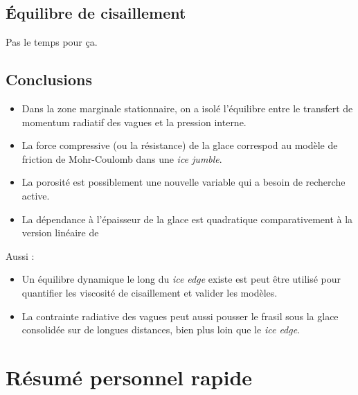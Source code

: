 \documentclass[10pt]{article}
\numberwithin{equation}{section}
\begin{document}
\subsection{Équilibre de cisaillement}
\label{sec:orge96c6eb}

Pas le temps pour ça.
\subsection{Conclusions}
\label{sec:org67411be}

\begin{itemize}
\item Dans la zone marginale stationnaire, on a isolé l'équilibre entre le transfert de momentum radiatif des vagues et la pression interne.
\item La force compressive (ou la résistance) de la glace correspod au modèle de friction de Mohr-Coulomb dans une \emph{ice jumble}.
\item La porosité est possiblement une nouvelle variable qui a besoin de recherche active.
\item La dépendance à l'épaisseur de la glace est quadratique comparativement à la version linéaire de \Textcite{hibler1979dynamic}
\end{itemize}

Aussi :
\begin{itemize}
\item Un équilibre dynamique le long du \emph{ice edge} existe est peut être utilisé pour quantifier les viscosité de cisaillement et valider les modèles.
\item La contrainte radiative des vagues peut aussi pousser le frasil sous la glace consolidée sur de longues distances, bien plus loin que le \emph{ice edge}.
\end{itemize}
\section{Résumé personnel rapide}
\label{sec:orgf718b76}
\end{document}

